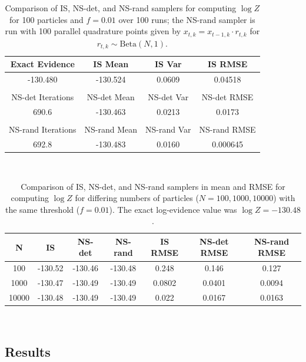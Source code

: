 \documentclass[psamsfonts]{amsart}
\begin{document}
\begin{table}\centering
\caption{Comparison of IS, NS-det, and NS-rand samplers for computing $\log Z$ for 100 particles and $f = 0.01$ over 100 runs; the NS-rand sampler is run with 100 parallel quadrature points given by $x_{t,k} = x_{t-1,k} \cdot r_{t,k}$ for $r_{t,k} \sim \text{Beta}(N,1)$.}
\begin{tabular}{c|c|c|c}
Exact Evidence & IS Mean & IS Var & IS RMSE\\\hline
-130.480 & -130.524 & 0.0609 & 0.04518 \\
& & & \\
NS-det Iterations  & NS-det Mean & NS-det Var & NS-det RMSE \\\hline
690.6 & -130.463 & 0.0213 & 0.0173\\
& & & \\
NS-rand Iterations & NS-rand Mean & NS-rand Var & NS-rand RMSE \\\hline
692.8 & -130.483 & 0.0160  & 0.000645 \\
\end{tabular}\\

\end{table}

\begin{table}\centering
\caption{Comparison of IS, NS-det, and NS-rand samplers in mean and RMSE for computing $\log Z$ for differing numbers of particles ($N = 100, 1000, 10000$) with the same threshold ($f = 0.01$). The exact log-evidence value was $\log Z = -130.48$.}
\begin{tabular}{c|c|c|c|c|c|c}
N & IS & NS-det & NS-rand & IS RMSE & NS-det RMSE & NS-rand RMSE \\\hline
100 &-130.52 & -130.46 & -130.48 & 0.248 & 0.146 & 0.127\\
1000 & -130.47 & -130.49 & -130.49 & 0.0802 & 0.0401 & 0.0094 \\
10000 & -130.48 & -130.49 & -130.49 & 0.022 & 0.0167 & 0.0163\\

\end{tabular}\\



\end{table}

\subsection{Results}
\end{document}
